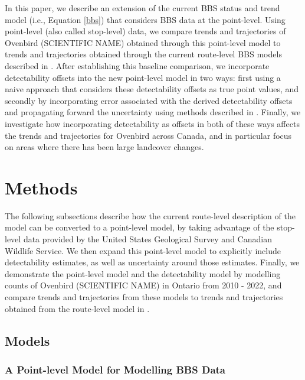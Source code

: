 \documentclass[12pt]{article}
\begin{document}
\par In this paper, we describe an extension of the current BBS status and trend model (i.e., Equation \ref{bbs}) that considers BBS data at the point-level. 
Using point-level (also called stop-level) data, we compare trends and trajectories of Ovenbird (SCIENTIFIC NAME) obtained through this point-level model to trends and trajectories obtained through the current route-level BBS models described in \citet{smith_spatially_2023}.
After establishing this baseline comparison, we incorporate detectability offsets into the new point-level model in two ways: first using a naive approach that considers these detectability offsets as true point values, and secondly by incorporating error associated with the derived detectability offsets and propagating forward the uncertainty using methods described in \citet{bravington_variance_2021}.
Finally, we investigate how incorporating detectability as offsets in both of these ways affects the trends and trajectories for Ovenbird across Canada, and in particular focus on areas where there has been large landcover changes.

\section{Methods}

\par The following subsections describe how the current route-level description of the model can be converted to a point-level model, by taking advantage of the stop-level data provided by the United States Geological Survey and Canadian Wildlife Service. 
We then expand this point-level model to explicitly include detectability estimates, as well as uncertainty around those estimates. 
Finally, we demonstrate the point-level model and the detectability model by modelling counts of Ovenbird (SCIENTIFIC NAME) in Ontario from 2010 - 2022, and compare trends and trajectories from these models to trends and trajectories obtained from the route-level model in \citet{smith_spatially_2023}.

\subsection{Models}

\subsubsection{A Point-level Model for Modelling BBS Data}
\end{document}
